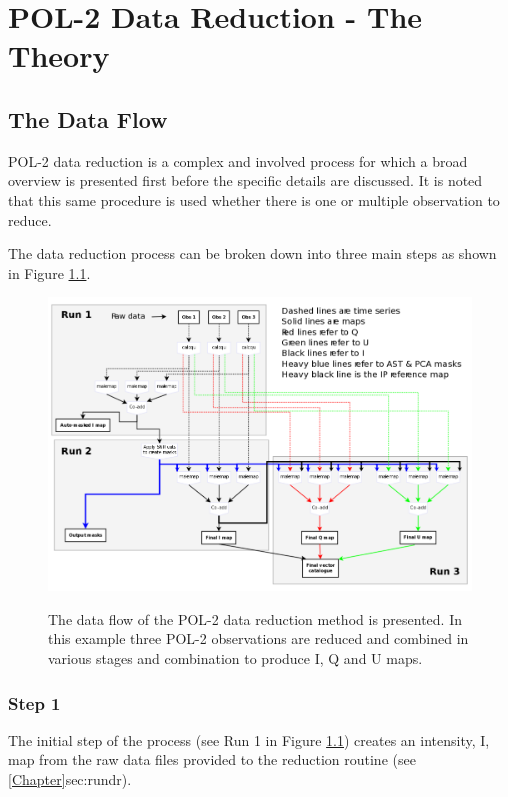 \chapter{POL-2 Data Reduction - The Theory}
\label{sec:dr}
\section{The Data Flow}

POL-2 data reduction is a complex and involved process for which a broad overview is presented first before
the specific details are discussed. It is noted that this same procedure is used whether there is one or 
multiple observation to reduce.

The data reduction process can be broken down into three main steps as shown in Figure \ref{fig:pol2drflow}.

\begin{figure}[t!]
\begin{center}
\includegraphics[width=0.95\linewidth]{pol2-dr-flow.png}
\label{fig:pol2drflow}
\caption [POL-2 Data Flow]{
  \small The data flow of the POL-2 data reduction method is
  presented. In this example three POL-2 observations are
  reduced and combined in various stages and combination to
  produce I, Q and U maps.
}
\end{center}
\end{figure}


\subsection*{Step 1}

The initial step of the process (see Run 1 in Figure \ref{fig:pol2drflow}) creates 
an intensity, I, map from the raw data files provided to the reduction routine (see \cref{Chapter}{sec:rundr}). 


